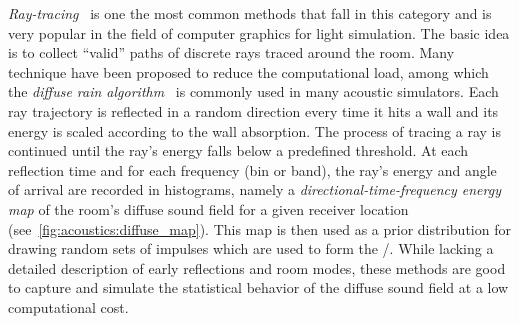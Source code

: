 \mynewline
\textit{Ray-tracing}~ is one the most common methods that fall in this category and is very popular in the field of computer graphics for light simulation.
The basic idea is to collect ``valid'' paths of discrete rays traced around the room.
Many technique have been proposed to reduce the computational load, among which the \textit{diffuse rain algorithm}~ is commonly used in many acoustic simulators.
Each ray trajectory is reflected in a random direction every time it hits a wall and its energy is scaled according to the wall absorption.
The process of tracing a ray is continued until the ray’s energy falls below a predefined threshold.
At each reflection time and for each frequency (bin or band), the ray's energy and angle of arrival are recorded in histograms,
namely a \textit{directional-time-frequency energy map} of the room’s diffuse sound field for a given receiver location (see~\cref{fig:acoustics:diffuse_map}). This map is then used as a prior distribution for drawing random sets of impulses which are used to form the \RIR/.
While lacking a detailed description of early reflections and room modes,
these methods are good to capture and simulate the statistical behavior of the diffuse sound field at a low computational cost.

